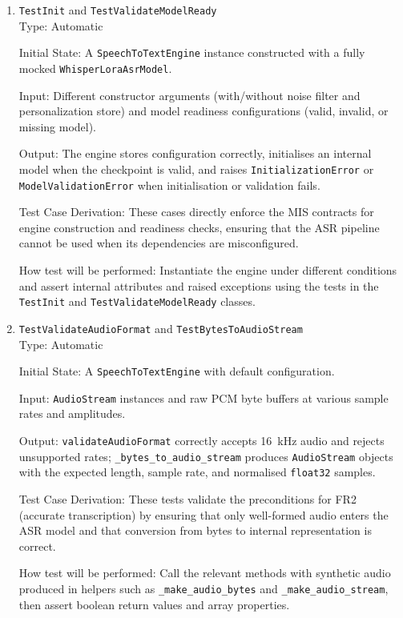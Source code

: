 \documentclass[12pt, titlepage]{article}
\begin{document}
\begin{enumerate}
\item{\texttt{TestInit} and \texttt{TestValidateModelReady}\\}
Type: Automatic

Initial State: A \texttt{SpeechToTextEngine} instance constructed with a fully mocked \texttt{WhisperLoraAsrModel}.

Input: Different constructor arguments (with/without noise filter and personalization store) and model readiness configurations (valid, invalid, or missing model).

Output: The engine stores configuration correctly, initialises an internal model when the checkpoint is valid, and raises \texttt{InitializationError} or \texttt{ModelValidationError} when initialisation or validation fails.

Test Case Derivation: These cases directly enforce the MIS contracts for engine construction and readiness checks, ensuring that the ASR pipeline cannot be used when its dependencies are misconfigured.

How test will be performed: Instantiate the engine under different conditions and assert internal attributes and raised exceptions using the tests in the \texttt{TestInit} and \texttt{TestValidateModelReady} classes.

\item{\texttt{TestValidateAudioFormat} and \texttt{TestBytesToAudioStream}\\}
Type: Automatic

Initial State: A \texttt{SpeechToTextEngine} with default configuration.

Input: \texttt{AudioStream} instances and raw PCM byte buffers at various sample rates and amplitudes.

Output: \texttt{validateAudioFormat} correctly accepts 16~kHz audio and rejects unsupported rates; \texttt{\_bytes\_to\_audio\_stream} produces \texttt{AudioStream} objects with the expected length, sample rate, and normalised \texttt{float32} samples.

Test Case Derivation: These tests validate the preconditions for FR2 (accurate transcription) by ensuring that only well-formed audio enters the ASR model and that conversion from bytes to internal representation is correct.

How test will be performed: Call the relevant methods with synthetic audio produced in helpers such as \texttt{\_make\_audio\_bytes} and \texttt{\_make\_audio\_stream}, then assert boolean return values and array properties.


\end{enumerate}
\end{document}
